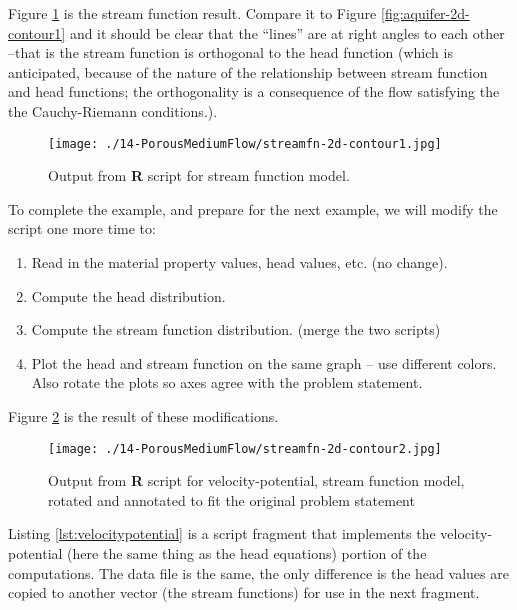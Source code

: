 Figure \ref{fig:streamfn-2d-contour1} is the stream function result.  
Compare it to Figure \ref{fig:aquifer-2d-contour1} and it should be clear that the ``lines'' are at right angles to each other --that is the stream function is orthogonal to the head function (which is anticipated, because of the nature of the relationship between stream function and head functions; the orthogonality is a consequence of the flow satisfying the the Cauchy-Riemann conditions.).

\begin{figure}[h!] %
   \centering
   \texttt{[image: ./14-PorousMediumFlow/streamfn-2d-contour1.jpg]} 
   \caption{Output from \textbf{R} script for stream function model.}
   \label{fig:streamfn-2d-contour1}
\end{figure}

To complete the example, and prepare for the next example, we will modify the script one more time to:
\begin{enumerate}
\item Read in the material property values, head values, etc.  (no change).
\item Compute the head distribution.
\item Compute the stream function distribution. (merge the two scripts)
\item Plot the head and stream function on the same graph -- use different colors.  Also rotate the plots so axes agree with the problem statement.
\end{enumerate}

Figure \ref{fig:streamfn-2d-contour2} is the result of these modifications.  


\begin{figure}[h!] %
   \centering
   \texttt{[image: ./14-PorousMediumFlow/streamfn-2d-contour2.jpg]} 
   \caption{Output from \textbf{R} script for velocity-potential, stream function model, rotated and annotated to fit the original problem statement}
   \label{fig:streamfn-2d-contour2}
\end{figure}

Listing \ref{lst:velocitypotential} is a script fragment that implements the velocity-potential (here the same thing as the head equations) portion of the computations.  
The data file is the same, the only difference is the head values are copied to another vector (the stream functions) for use in the next fragment.

